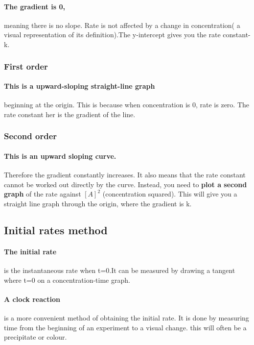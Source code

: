 \paragraph{The gradient is 0,}meaning there is no slope. Rate is not affected by a change in concentration( a visual representation of its definition).The y-intercept gives you the rate constant-k.
\subsubsection{First order}
\paragraph{This is a upward-sloping straight-line graph}beginning at the origin. This is because when concentration is 0, rate is zero. The rate constant her is the gradient of the line.
\subsubsection{Second order}
\paragraph{This is an upward sloping curve.}Therefore the gradient constantly increases. It also means that the rate constant cannot be worked out directly by the curve. Instead, you need to \textbf{plot a second graph} of the rate against $[A]^2$ (concentration squared). This will give you a straight line graph through the origin, where the gradient is k.
\subsection{Initial rates method}
\paragraph{The initial rate}is the instantaneous rate when t=0.It can be measured by drawing a tangent where t=0 on a concentration-time graph.
\paragraph{A clock reaction}is a more convenient method of obtaining the initial rate. It is done by measuring time from the beginning of an experiment to a visual change. this will often be a precipitate or colour.


